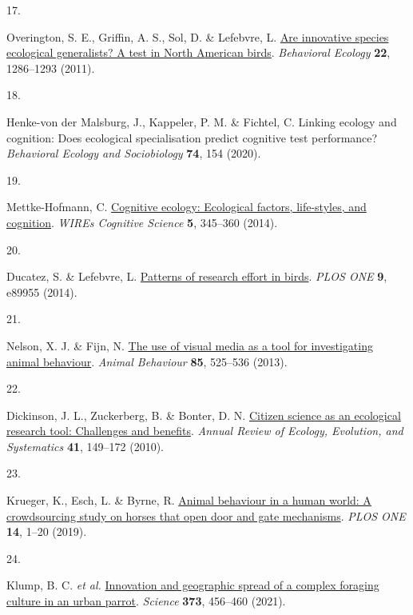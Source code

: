 \documentclass[
  man,floatsintext]{apa6}
\newlength{\cslhangindent}
\newlength{\csllabelwidth}
\newlength{\cslentryspacingunit} %
\newenvironment{CSLReferences}[2] %
 {%
  \setlength{\parindent}{0pt}
  \ifodd #1
  \let\oldpar\par
  \def\par{\hangindent=\cslhangindent\oldpar}
  \fi
  \setlength{\parskip}{#2\cslentryspacingunit}
 }%
 {}
\newcommand{\CSLLeftMargin}[1]{\parbox[t]{\csllabelwidth}{#1}}
\newcommand{\CSLRightInline}[1]{\parbox[t]{\linewidth - \csllabelwidth}{#1}\break}
\begin{document}
\begin{CSLReferences}{0}{0}
\leavevmode{}%
\CSLLeftMargin{17. }%
\CSLRightInline{Overington, S. E., Griffin, A. S., Sol, D. \& Lefebvre, L. \href{https://doi.org/10.1093/beheco/arr130}{Are innovative species ecological generalists? A test in {N}orth {A}merican birds}. \emph{Behavioral Ecology} \textbf{22}, 1286--1293 (2011).}

\leavevmode{}%
\CSLLeftMargin{18. }%
\CSLRightInline{Henke-von der Malsburg, J., Kappeler, P. M. \& Fichtel, C. Linking ecology and cognition: Does ecological specialisation predict cognitive test performance? \emph{Behavioral Ecology and Sociobiology} \textbf{74}, 154 (2020).}

\leavevmode{}%
\CSLLeftMargin{19. }%
\CSLRightInline{Mettke-Hofmann, C. \href{https://doi.org/10.1002/wcs.1289}{Cognitive ecology: Ecological factors, life-styles, and cognition}. \emph{WIREs Cognitive Science} \textbf{5}, 345--360 (2014).}

\leavevmode{}%
\CSLLeftMargin{20. }%
\CSLRightInline{Ducatez, S. \& Lefebvre, L. \href{https://doi.org/10.1371/journal.pone.0089955}{Patterns of research effort in birds}. \emph{PLOS ONE} \textbf{9}, e89955 (2014).}

\leavevmode{}%
\CSLLeftMargin{21. }%
\CSLRightInline{Nelson, X. J. \& Fijn, N. \href{https://doi.org/10.1016/j.anbehav.2012.12.009}{The use of visual media as a tool for investigating animal behaviour}. \emph{Animal Behaviour} \textbf{85}, 525--536 (2013).}

\leavevmode{}%
\CSLLeftMargin{22. }%
\CSLRightInline{Dickinson, J. L., Zuckerberg, B. \& Bonter, D. N. \href{https://doi.org/10.1146/annurev-ecolsys-102209-144636}{Citizen science as an ecological research tool: Challenges and benefits}. \emph{Annual Review of Ecology, Evolution, and Systematics} \textbf{41}, 149--172 (2010).}

\leavevmode{}%
\CSLLeftMargin{23. }%
\CSLRightInline{Krueger, K., Esch, L. \& Byrne, R. \href{https://doi.org/10.1371/journal.pone.0218954}{Animal behaviour in a human world: A crowdsourcing study on horses that open door and gate mechanisms}. \emph{PLOS ONE} \textbf{14}, 1--20 (2019).}

\leavevmode{}%
\CSLLeftMargin{24. }%
\CSLRightInline{Klump, B. C. \emph{et al.} \href{https://doi.org/10.1126/science.abe7808}{Innovation and geographic spread of a complex foraging culture in an urban parrot}. \emph{Science} \textbf{373}, 456--460 (2021).}


\end{CSLReferences}
\end{document}
